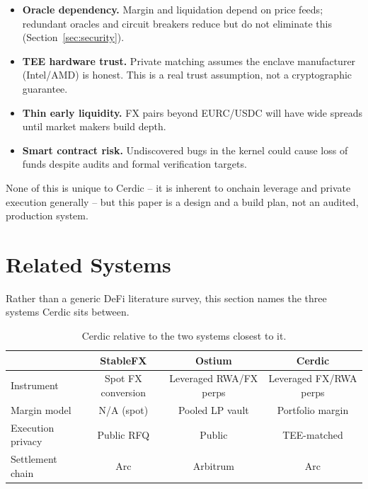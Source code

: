\documentclass[11pt,a4paper]{article}
\begin{document}
\begin{itemize}
  \item \textbf{Oracle dependency.} Margin and liquidation depend on price feeds; redundant oracles and circuit breakers reduce but do not eliminate this (Section~\ref{sec:security}).
  \item \textbf{TEE hardware trust.} Private matching assumes the enclave manufacturer (Intel/AMD) is honest. This is a real trust assumption, not a cryptographic guarantee.
  \item \textbf{Thin early liquidity.} FX pairs beyond EURC/USDC will have wide spreads until market makers build depth.
  \item \textbf{Smart contract risk.} Undiscovered bugs in the kernel could cause loss of funds despite audits and formal verification targets.
\end{itemize}

None of this is unique to Cerdic -- it is inherent to onchain leverage and private execution generally -- but this paper is a design and a build plan, not an audited, production system.

\section{Related Systems}
\label{sec:related}

Rather than a generic DeFi literature survey, this section names the three systems Cerdic sits between.

\begin{table}[h]
  \centering
  \begin{tabular}{lccc}
    \toprule
    & \textbf{StableFX} & \textbf{Ostium} & \textbf{Cerdic} \\
    \midrule
    Instrument & Spot FX conversion & Leveraged RWA/FX perps & Leveraged FX/RWA perps \\
    Margin model & N/A (spot) & Pooled LP vault & Portfolio margin \\
    Execution privacy & Public RFQ & Public & TEE-matched \\
    Settlement chain & Arc & Arbitrum & Arc \\
    \bottomrule
  \end{tabular}
  \caption{Cerdic relative to the two systems closest to it.}
  \label{tab:comparison}
\end{table}
\end{document}
